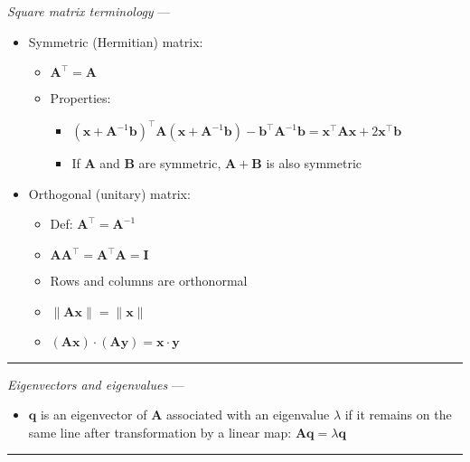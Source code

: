 \emph{Square matrix terminology} ---
\begin{itemize}
    \item Symmetric (Hermitian) matrix:
    \begin{itemize}
        \item $\boldsymbol{A}^\intercal = \boldsymbol{A}$
        \item Properties:
        \begin{itemize}
            \item $( \boldsymbol{x} + \boldsymbol{A}^{-1} \boldsymbol{b} )^\intercal \boldsymbol{A} ( \boldsymbol{x} + \boldsymbol{A}^{-1} \boldsymbol{b} ) - \boldsymbol{b}^\intercal \boldsymbol{A}^{-1} \boldsymbol{b} = \boldsymbol{x}^\intercal \boldsymbol{A} \boldsymbol{x} + 2 \boldsymbol{x}^\intercal \boldsymbol{b}$
            \item If $\boldsymbol{A}$ and $\boldsymbol{B}$ are symmetric, $\boldsymbol{A} + \boldsymbol{B}$ is also symmetric
        \end{itemize}
    \end{itemize}
    \item Orthogonal (unitary) matrix: 
    \begin{itemize}
        \item Def: $\boldsymbol{A}^\intercal = \boldsymbol{A}^{-1}$
        \item $\boldsymbol{A}\boldsymbol{A}^\intercal = \boldsymbol{A}^\intercal\boldsymbol{A} = \boldsymbol{I}$
        \item Rows and columns are orthonormal
        \item $\|\boldsymbol{A} \boldsymbol{x}\| = \|\boldsymbol{x}\|$
        \item $(\boldsymbol{A}\boldsymbol{x}) \cdot (\boldsymbol{A}\boldsymbol{y}) = \boldsymbol{x} \cdot \boldsymbol{y}$
    \end{itemize}    
\end{itemize}

{\color{lightgray}\hrule height 0.001mm}

\emph{Eigenvectors and eigenvalues} --- 
\begin{itemize}
    \item $\boldsymbol{q}$ is an eigenvector of $\boldsymbol{A}$ associated with an eigenvalue $\lambda$ if it remains on the same line after transformation by a linear map: $\boldsymbol{A}\boldsymbol{q} = \lambda\boldsymbol{q}$
\end{itemize}

{\color{lightgray}\hrule height 0.001mm}

